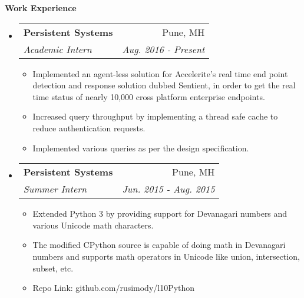 \documentclass[letterpaper,12pt]{article}
\makeatletter
\newcommand{\resitem}[1]{\item #1 \vspace{-2pt}}
\newcommand{\resheading}[1]{{\large \colorbox{mygrey}{\begin{minipage}{\textwidth}{\textbf{#1 \vphantom{p\^{E}}}}\end{minipage}}}}
\newcommand{\ressubheading}[4]{
  \begin{tabular*}{7.0in}{l@{\extracolsep{\fill}}r}
    \textbf{#1} & #2 \\
    \textit{#3} & \textit{#4} \\
  \end{tabular*}\vspace{-6pt}}
\newif\ifhighschool
\makeatother
\begin{document}
\resheading{Work Experience}
\begin{itemize}
\item
  \ressubheading{Persistent Systems}{Pune, MH}{Academic Intern}{Aug. 2016 - Present}
  \begin{itemize}
    \resitem{Implemented an agent-less solution for Accelerite's real time end point detection and response solution dubbed Sentient, in order to get the real time status of nearly 10,000 cross platform enterprise endpoints.}
    \resitem{Increased query throughput by implementing a thread safe cache to reduce authentication requests.}
    \resitem{Implemented various queries as per the design specification.}
  \end{itemize}
\item
  \ressubheading{Persistent Systems}{Pune, MH}{Summer Intern}{Jun. 2015 - Aug. 2015}
  \begin{itemize}
    \resitem{Extended Python 3 by providing support for Devanagari numbers and various Unicode math characters.}
    \resitem{The modified CPython source is capable of doing math in Devanagari numbers and supports math operators in Unicode like union, intersection, subset, etc.}
    \resitem{Repo Link: github.com/rusimody/l10Python}
  \end{itemize}
\end{itemize}

\ifhighschool
\pagebreak
\fi
\end{document}
